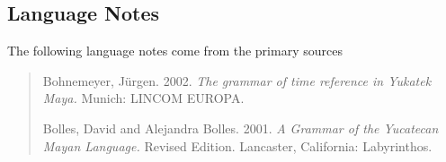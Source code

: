 \documentclass[a4paper, 11pt]{book}
\begin{document}
%

\subsection{Language Notes}

The following language notes come from the primary sources \citep{bohnemeyer2002grammar, maimonides1989grammar}

\begin{quote}
  Bohnemeyer, Jürgen. 2002. \textit{The grammar of time reference in Yukatek Maya.} Munich: LINCOM EUROPA.

  
  Bolles, David and Alejandra Bolles. 2001. \textit{A Grammar of the Yucatecan Mayan Language.} Revised Edition. Lancaster, California: Labyrinthos.
\end{quote}
\end{document}
